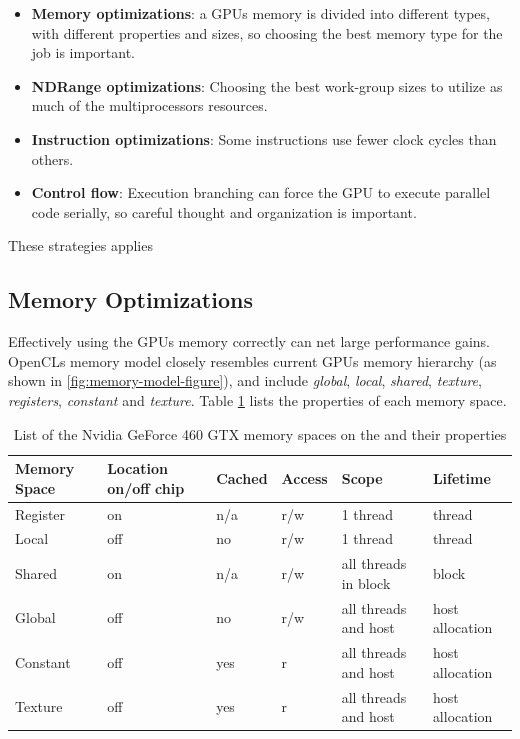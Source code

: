 \begin{itemize}

\item \textbf{Memory optimizations}: a GPUs memory is divided into different
types, with different properties and sizes, so choosing the best   memory type
for the job is important.

\item \textbf{NDRange optimizations}: Choosing the best work-group   sizes to
utilize as much of the multiprocessors resources.

\item \textbf{Instruction optimizations}: Some instructions use fewer   clock
cycles than others.

\item \textbf{Control flow}: Execution branching can force the GPU to
execute parallel code serially, so careful thought and organization   is
important.

\end{itemize}

These strategies applies

\subsection{Memory Optimizations}

Effectively using the GPUs memory correctly can net large performance gains.
OpenCLs memory model closely resembles current GPUs memory hierarchy (as shown
in \ref{fig:memory-model-figure}), and include \textit{global},
\textit{local}, \textit{shared}, \textit{texture}, \textit{registers},
\textit{constant} and \textit{texture}. Table \ref{table:memory-properties}
lists the properties of each memory space.

\begin{table}
  \begin{tabular}{|l|l|l|l|l|l|}
    \hline
    Memory Space & Location on/off chip & Cached & Access & Scope                & Lifetime        \\ \hline
    Register     & on                   & n/a    & r/w    & 1 thread             & thread          \\
    Local        & off                  & no     & r/w    & 1 thread             & thread          \\
    Shared       & on                   & n/a    & r/w    & all threads in block & block           \\
    Global       & off                  & no     & r/w    & all threads and host & host allocation \\
    Constant     & off                  & yes    & r      & all threads and host & host allocation \\
    Texture      & off                  & yes    & r      & all threads and host & host allocation \\
    \hline
  \end{tabular}
  \label{table:memory-properties}
  \caption{List of the Nvidia GeForce 460 GTX memory spaces on the and their properties}
\end{table}


